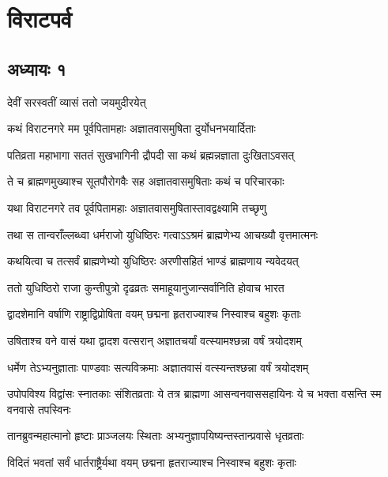 \part{विराटपर्व}
\chapter{अध्यायः १}

{देवीं सरस्वतीं व्यासं ततो जयमुदीरयेत्}



\twolineshloka
{कथं विराटनगरे मम पूर्वपितामहाः}
{अज्ञातवासमुषिता दुर्योधनभयार्दिताः}


\twolineshloka
{पतिव्रता महाभागा सततं सुखभागिनी}
{द्रौपदी सा कथं ब्रह्मन्नज्ञाता दुःखिताऽवसत्}


\twolineshloka
{ते च ब्राह्मणमुख्याश्च सूतपौरोगवैः सह}
{अज्ञातवासमुषिताः कथं च परिचारकाः}



\twolineshloka
{यथा विराटनगरे तव पूर्वपितामहाः}
{अज्ञातवासमुषितास्तावद्वक्ष्यामि तच्छृणु}


\twolineshloka
{तथा स तान्वराँल्लब्ध्वा धर्मराजो युधिष्ठिरः}
{गत्वाऽऽश्रमं ब्राह्मणेभ्य आचख्यौ वृत्तमात्मनः}


\twolineshloka
{कथयित्वा च तत्सर्वं ब्राह्मणेभ्यो युधिष्ठिरः}
{अरणीसहितं भाण्डं ब्राह्मणाय न्यवेदयत्}


\twolineshloka
{ततो युधिष्ठिरो राजा कुन्तीपुत्रो दृढव्रतः}
{समाहूयानुजान्सर्वानिति होवाच भारत}


\twolineshloka
{द्वादशेमानि वर्षाणि राष्ट्राद्विप्रोषिता वयम्}
{छद्मना हृतराज्याश्च निस्वाश्च बहुशः कृताः}


\twolineshloka
{उषिताश्च वने वासं यथा द्वादश वत्सरान्}
{अज्ञातचर्यां वत्स्यामश्छन्ना वर्षं त्रयोदशम्}



\twolineshloka
{धर्मेण तेऽभ्यनुज्ञाताः पाण्डवाः सत्यविक्रमाः}
{अज्ञातवासं वत्स्यन्तश्छन्ना वर्षं त्रयोदशम्}


\threelineshloka
{उपोपविश्य विद्वांसः स्नातकाः संशितव्रताः}
{ये तत्र ब्राह्मणा आसन्वनवाससहायिनः}
{ये च भक्ता वसन्ति स्म वनवासे तपस्विनः}


\twolineshloka
{तानब्रुवन्महात्मानो हृष्टाः प्राञ्जलयः स्थिताः}
{अभ्यनुज्ञापयिष्यन्तस्तान्प्रवासे धृतव्रताः}


\twolineshloka
{विदितं भवतां सर्वं धार्तराष्ट्रैर्यथा वयम्}
{छद्मना हृतराज्याश्च निस्वाश्च बहुशः कृताः}


